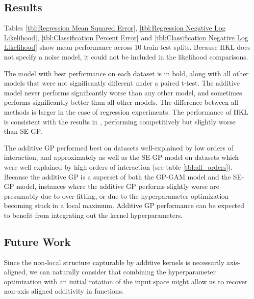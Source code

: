 \subsection{Results}

Tables \ref{tbl:Regression Mean Squared Error}, \ref{tbl:Regression Negative Log Likelihood}, \ref{tbl:Classification Percent Error} and \ref{tbl:Classification Negative Log Likelihood} show mean performance across 10 train-test splits.  Because HKL does not specify a noise model, it could not be included in the likelihood comparisons.






The model with best performance on each dataset is in bold, along with all other models that were not significantly different under a paired t-test. The additive model never performs significantly worse than any other model, and sometimes performs significantly better than all other models.  The difference between all methods is larger in the case of regression experiments. The performance of HKL is consistent with the results in \cite{DBLP:journals/corr/abs-0909-0844}, performing competitively but slightly worse than SE-GP.%

The additive GP performed best on datasets well-explained by low orders of interaction, and approximately as well as the SE-GP model on datasets which were well explained by high orders of interaction (see table \ref{tbl:all_orders}).
Because the additive GP is a superset of both the GP-GAM model and the SE-GP model, instances where the additive GP performs slightly worse are presumably due to over-fitting, or due to the hyperparameter optimization becoming stuck in a local maximum. %
Additive GP performance can be expected to benefit from integrating out the kernel hyperparameters.



\subsection{Future Work}
Since the non-local structure capturable by additive kernels is necessarily axis-aligned, we can naturally consider that combining the hyperparameter optimization with an initial rotation of the input space might allow us to recover non-axis aligned additivity in functions.

